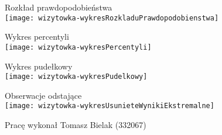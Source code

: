 \documentclass{article}
\begin{document}
\begin{multicols}{3}
\columnbreak
\begin{center}
{\large Rozkład prawdopodobieństwa}\\

\texttt{[image: wizytowka-wykresRozkladuPrawdopodobienstwa]}

\end{center}
\begin{center}
{\large Wykres percentyli}\\

\texttt{[image: wizytowka-wykresPercentyli]}

\end{center}
\columnbreak
\begin{center}
{\large Wykres pudełkowy}\\

\texttt{[image: wizytowka-wykresPudelkowy]}
\end{center}
\begin{center}
{\large Obserwacje odstające}\\

\texttt{[image: wizytowka-wykresUsunieteWynikiEkstremalne]}
\end{center}
\end{multicols}
\begin{center}
Pracę wykonał Tomasz Bielak (332067)
\end{center}
\end{document}
